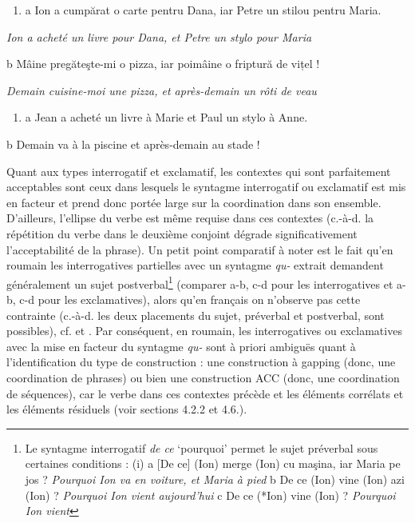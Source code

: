 \begin{enumerate}
\item \label{bkm:Ref289033162}a  Ion a cumpărat o carte pentru Dana, iar Petre un stilou pentru Maria.


\end{enumerate}
{\itshape
Ion a acheté un livre pour Dana, et Petre un stylo pour Maria  } 

  b  Mâine pregăteşte-mi o pizza, iar poimâine o friptură de vițel !

{\itshape
Demain cuisine-moi une pizza, et après-demain un rôti de veau} 


\begin{enumerate}
\item \label{bkm:Ref289033177}a   Jean a acheté un livre à Marie et Paul un stylo à Anne.


\end{enumerate}
b  Demain va à la piscine et après-demain au stade ! 

Quant aux types interrogatif et exclamatif, les contextes qui sont parfaitement acceptables sont ceux dans lesquels le syntagme interrogatif ou exclamatif est mis en facteur et prend donc portée large sur la coordination dans son ensemble. D'ailleurs, l'ellipse du verbe est même requise dans ces contextes (c.-à-d. la répétition du verbe dans le deuxième conjoint dégrade significativement l'acceptabilité de la phrase). Un petit point comparatif à noter est le fait qu'en roumain les interrogatives partielles avec un syntagme \textit{qu-} extrait demandent généralement un sujet postverbal\footnote{Le syntagme interrogatif \textit{de ce} `pourquoi' permet le sujet préverbal sous certaines conditions :
(i)  a  [De ce] (Ion) merge (Ion) cu maşina, iar Maria pe jos ?
    \textit{Pourquoi Ion va en voiture, et Maria à pied}
  b  De ce (Ion) vine (Ion) azi (Ion) ?
    \textit{Pourquoi Ion vient aujourd'hui}
  c  De ce (*Ion) vine (Ion) ? 
    \textit{Pourquoi Ion vient}} (comparer a-b, c-d pour les interrogatives et a-b, c-d pour les exclamatives), alors qu'en français on n'observe pas cette contrainte (c.-à-d. les deux placements du sujet, préverbal et postverbal, sont possibles), cf.  et . Par conséquent, en roumain, les interrogatives ou exclamatives avec la mise en facteur du syntagme \textit{qu-} sont à priori ambiguës quant à l'identification du type de construction : une construction à gapping (donc, une coordination de phrases) ou bien une construction ACC (donc, une coordination de séquences), car le verbe dans ces contextes précède et les éléments corrélats et les éléments résiduels (voir sections 4.2.2 et 4.6.). 


